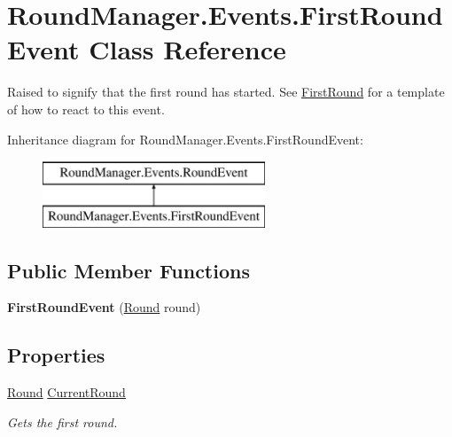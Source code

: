 \hypertarget{class_round_manager_1_1_events_1_1_first_round_event}{}\section{Round\+Manager.\+Events.\+First\+Round\+Event Class Reference}
\label{class_round_manager_1_1_events_1_1_first_round_event}


Raised to signify that the first round has started. See \hyperlink{class_round_manager_1_1_first_round}{First\+Round} for a template of how to react to this event.  


Inheritance diagram for Round\+Manager.\+Events.\+First\+Round\+Event\+:\begin{figure}[H]
\begin{center}
\leavevmode
\includegraphics[height=2.000000cm]{class_round_manager_1_1_events_1_1_first_round_event}
\end{center}
\end{figure}
\subsection*{Public Member Functions}
\begin{DoxyCompactItemize}
\item 
\hypertarget{class_round_manager_1_1_events_1_1_first_round_event_a30574b3864adf7b0a26473bea4c62fa0}{}{\bfseries First\+Round\+Event} (\hyperlink{class_round_manager_1_1_round}{Round} round)\label{class_round_manager_1_1_events_1_1_first_round_event_a30574b3864adf7b0a26473bea4c62fa0}

\end{DoxyCompactItemize}
\subsection*{Properties}
\begin{DoxyCompactItemize}
\item 
\hyperlink{class_round_manager_1_1_round}{Round} \hyperlink{class_round_manager_1_1_events_1_1_first_round_event_ac596413ac1e0d633466dca637229b09e}{Current\+Round}
\begin{DoxyCompactList}\small\item\em Gets the first round. \end{DoxyCompactList}\end{DoxyCompactItemize}


